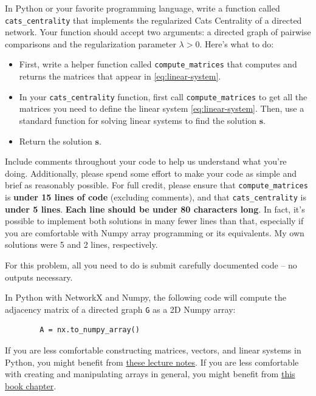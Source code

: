 \documentclass{hw}
\begin{document}
In Python or your favorite programming language, write a function called \texttt{cats\_centrality} that implements the regularized Cats Centrality of a directed network. 
Your function should accept two arguments: a directed graph of pairwise comparisons and the regularization parameter $\lambda > 0$. 
Here's what to do: 
\begin{itemize}
    \item First, write a helper function called \texttt{compute\_matrices} that computes and returns the matrices that appear in \eqref{eq:linear-system}. 
    \item In your \texttt{cats\_centrality} function, first call \texttt{compute\_matrices} to get all the matrices you need to define the linear system \eqref{eq:linear-system}. 
    Then, use a standard function for solving linear systems to find the solution $\mathbf{s}$. 
    \item Return the solution $\mathbf{s}$. 
\end{itemize}
Include comments throughout your code to help us understand what you're doing. 
Additionally, please spend some effort to make your code as simple and brief as reasonably possible. 
For full credit, please ensure that \texttt{compute\_matrices} is \textbf{under 15 lines of code} (excluding comments), and that \texttt{cats\_centrality} is \textbf{under 5 lines}. 
\textbf{Each line should be under 80 characters long}. 
In fact, it's possible to implement both solutions in many fewer lines than that, especially if you are comfortable with Numpy array programming or its equivalents. 
My own solutions were 5 and 2 lines, respectively. 

For this problem, all you need to do is submit carefully documented code -- no outputs necessary. 

\begin{hint}
    In Python with NetworkX and Numpy, the following code will compute the adjacency matrix of a directed graph \texttt{G} as a 2D Numpy array: 
    \begin{verbatim}
        A = nx.to_numpy_array()
    \end{verbatim}
\end{hint}

\begin{hint}
    If you are less comfortable constructing matrices, vectors, and linear systems in Python, you might benefit from \href{https://nbviewer.org/github/PhilChodrow/PIC16B/blob/master/lectures/math/linear-algebra-I.ipynb}{these lecture notes}. 
    If you are less comfortable with creating and manipulating arrays in general, you might benefit from \href{https://jakevdp.github.io/PythonDataScienceHandbook/02.00-introduction-to-numpy.html}{this book chapter}. 
\end{hint}
\end{document}
